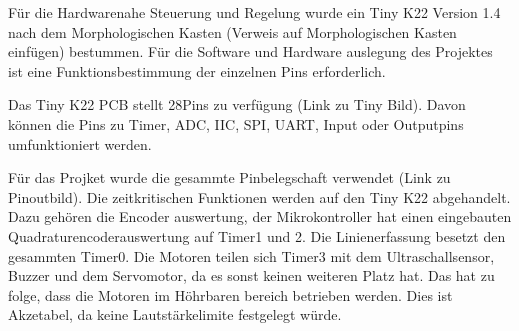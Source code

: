 Für die Hardwarenahe Steuerung und Regelung wurde ein Tiny K22 Version 1.4 nach dem Morphologischen Kasten (Verweis auf Morphologischen Kasten einfügen) bestummen. Für die Software und Hardware auslegung des Projektes ist eine Funktionsbestimmung der einzelnen Pins erforderlich.

Das Tiny K22 PCB stellt 28Pins zu verfügung (Link zu Tiny Bild). Davon können die Pins zu Timer, ADC, IIC, SPI, UART, Input oder Outputpins umfunktioniert werden.

Für das Projket wurde die gesammte Pinbelegschaft verwendet (Link zu Pinoutbild). Die zeitkritischen Funktionen werden auf den Tiny K22 abgehandelt. Dazu gehören die Encoder auswertung, der Mikrokontroller hat einen eingebauten Quadraturencoderauswertung auf Timer1 und 2. Die Linienerfassung besetzt den gesammten Timer0. Die Motoren teilen sich Timer3 mit dem Ultraschallsensor, Buzzer und dem Servomotor, da es sonst keinen weiteren Platz hat. Das hat zu folge, dass die Motoren im Höhrbaren bereich betrieben werden. Dies ist Akzetabel, da keine Lautstärkelimite festgelegt würde.










